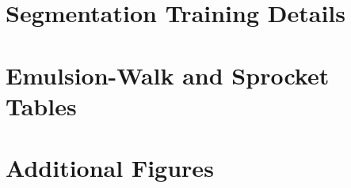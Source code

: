 \chapter{Segmentation Training Details}
\label{chap:app-segmentation}

\chapter{Emulsion-Walk and Sprocket Tables}
\label{chap:app-emulsion-walk}

\chapter{Additional Figures}
\label{chap:app-figures}
